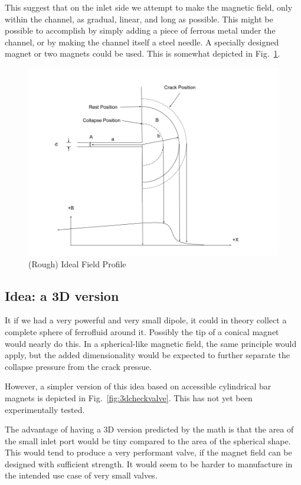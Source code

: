 \documentclass[]{asme2ej}
\begin{document}
This suggest that on the inlet side we attempt to make
the magnetic field, only within the channel, as gradual, linear, and
long as possible. This might be possible to accomplish by simply adding
a piece of ferrous metal under the channel, or by making the channel
itself a steel needle. A specially designed magnet or two magnets could be
used. This is somewhat depicted in Fig.~\ref{fig:ifp}.

\begin{figure}
\centerline{\includegraphics[width=6in]{figure/IdealFieldProfile.png}}
\caption{(Rough) Ideal Field Profile}
\label{fig:ifp}
\end{figure}


\subsection{Idea: a 3D version}

It if we had a very powerful and very small dipole, it could in theory
collect a complete sphere of ferrofluid around it. Possibly the tip
of a conical magnet would nearly do this.
In a spherical-like magnetic field, the same principle would
apply, but the added dimensionality would be expected to further
separate the collapse pressure from the crack pressue.

However, a simpler version of this idea based on accessible
cylindrical bar magnets is depicted in Fig.~\ref{fig:3dcheckvalve}.
This has not yet been experimentally tested.

The advantage of having a 3D version predicted by the math is that the area
of the small inlet port would be tiny compared to the area of the spherical
shape. This would tend to produce a very performant valve, if the magnet
field can be designed with sufficient strength. It would seem to be harder
to manufacture in the intended use case of very small valves.
\end{document}
